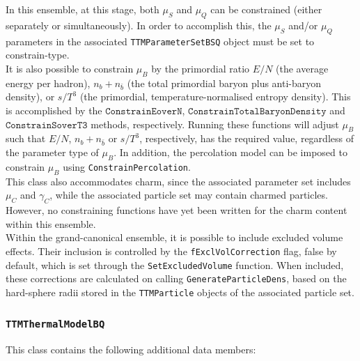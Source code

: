 \documentclass{elsarticle}
\begin{document}
In this ensemble, at this stage, both $\mu_S$ and $\mu_Q$ can be constrained (either separately or 
simultaneously). In order to accomplish this, the $\mu_S$ and/or $\mu_Q$ parameters in the associated 
\texttt{TTMParameterSetBSQ} object must be set to constrain-type.\\

It is also possible to constrain $\mu_B$ by the primordial ratio $E/N$ (the average energy per 
hadron), $n_b+n_{\bar{b}}$ (the total primordial baryon plus anti-baryon density), or $s/T^3$ (the 
primordial, temperature-normalised entropy density). 
This is accomplished by the $\texttt{ConstrainEoverN}$, $\texttt{ConstrainTotalBaryonDensity}$ and 
$\texttt{ConstrainSoverT3}$ methods, respectively. Running these functions will adjust $\mu_B$ such 
that $E/N$, $n_b+n_{\bar{b}}$ or $s/T^3$, respectively, has the required value, regardless of the 
parameter type of $\mu_B$. In addition, the percolation model \cite{Magas:2003wi} can be imposed 
to constrain $\mu_B$ using \texttt{ConstrainPercolation}.\\
  
This class also accommodates charm, since the associated parameter set includes 
$\mu_C$ and $\gamma_C$, while the associated particle set may contain charmed particles. However, 
no constraining functions have yet been written for the charm content within this ensemble.\\  

Within the grand-canonical ensemble, it is possible to include excluded volume effects. Their 
inclusion is controlled by 
the \texttt{fExclVolCorrection} flag, false by default, which is set through the 
\texttt{SetExcludedVolume} function. When included, these corrections are calculated on calling 
{\tt GenerateParticleDens}, based on the hard-sphere radii stored in the \texttt{TTMParticle} objects 
of the associated particle set.\\ 

\subsubsection{\texttt{TTMThermalModelBQ}}
This class contains the following additional data members:\\
\end{document}
